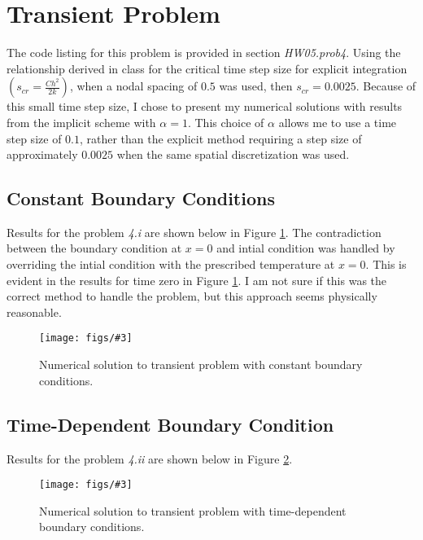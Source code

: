 \documentclass[letterpaper, 10pt, oneside]{article}
\newcommand{\Figure}[4]{
  \begin{figure}[#1]
    \centering
    \texttt{[image: figs/\#3]}
    \caption{#4.}\label{fig:#3}
  \end{figure}}
\begin{document}
\newpage

\section{Transient Problem}
The code listing for this problem is provided in section \emph{HW05.prob4}.  Using the relationship derived in class for the critical time step size for explicit integration $\left(s_{cr}=\frac{Ch^2}{2k}\right)$, when a nodal spacing of $0.5$ was used, then $s_{cr}=0.0025$.  Because of this small time step size, I chose to present my numerical solutions with results from the implicit scheme with $\alpha = 1$.  This choice of $\alpha$ allows me to use a time step size of $0.1$, rather than the explicit method requiring a step size of approximately $0.0025$ when the same spatial discretization was used.

\subsection{Constant Boundary Conditions}
Results for the problem \emph{4.i} are shown below in Figure \ref{fig:4i.pdf}.  The contradiction between the boundary condition at $x=0$ and intial condition was handled by overriding the intial condition with the prescribed temperature at $x=0$. This is evident in the results for time zero in Figure \ref{fig:4i.pdf}.  I am not sure if this was the correct method to handle the problem, but this approach seems physically reasonable.

\Figure{htp}{6}{4i.pdf}{Numerical solution to transient problem with constant boundary conditions}


\subsection{Time-Dependent Boundary Condition}
Results for the problem \emph{4.ii} are shown below in Figure \ref{fig:4ii.pdf}.

\Figure{htp}{6}{4ii.pdf}{Numerical solution to transient problem with time-dependent boundary conditions}
\end{document}
